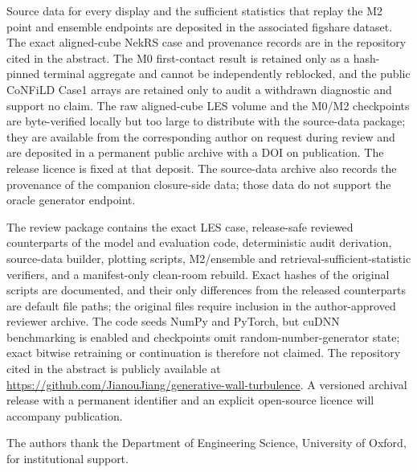 \documentclass[pdflatex,sn-nature]{sn-jnl}
\begin{document}
\maketitle






\backmatter

 Source data for every display and the sufficient statistics that replay
the M2 point and ensemble endpoints are deposited in the associated figshare dataset. The exact
aligned-cube NekRS case and provenance records are in the repository cited in the abstract. The
M0 first-contact result is retained only as a
hash-pinned terminal aggregate and cannot be independently reblocked, and the public CoNFiLD
Case1 arrays are retained only to audit a withdrawn diagnostic and support no claim. The raw
aligned-cube LES volume and the M0/M2 checkpoints are byte-verified locally but too large to
distribute with the source-data package; they are available from the corresponding author on
request during review and are deposited in a permanent public archive with a DOI on publication.
The release licence is fixed at that deposit. The source-data archive also records the provenance
of the companion closure-side data; those data do not support the oracle generator endpoint.

 The review package contains the exact LES case, release-safe reviewed
counterparts of the model and evaluation code, deterministic audit derivation, source-data
builder, plotting scripts, M2/ensemble and retrieval-sufficient-statistic verifiers, and a
manifest-only clean-room rebuild. Exact hashes of the original scripts are documented, and their
only differences from the released counterparts are default file paths; the original files
require inclusion in the author-approved reviewer archive. The code seeds NumPy and PyTorch, but
cuDNN benchmarking is enabled and checkpoints omit random-number-generator state; exact bitwise
retraining or continuation is therefore not claimed. The repository cited in the abstract is publicly available at \url{https://github.com/JianouJiang/generative-wall-turbulence}. A versioned archival release with a permanent
identifier and an explicit open-source licence will accompany publication.



 The authors thank the Department of Engineering Science, University of
Oxford, for institutional support.
\end{document}
